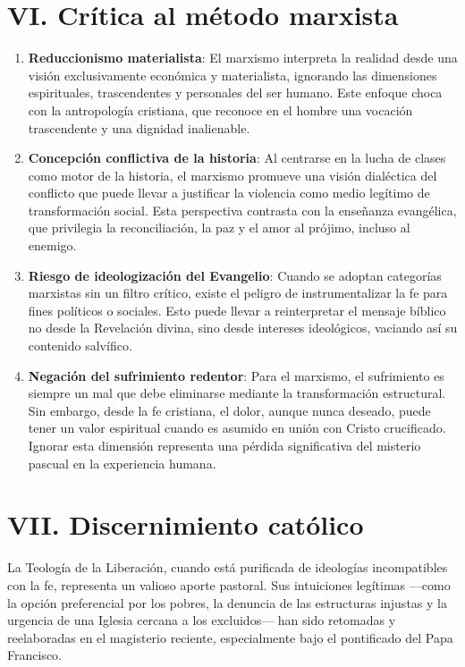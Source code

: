 \documentclass[12pt]{article}
\begin{document}
\section*{VI. Crítica al método marxista}
\begin{enumerate}
    \item \textbf{Reduccionismo materialista}: El marxismo interpreta la realidad desde una visión exclusivamente económica y materialista, ignorando las dimensiones espirituales, trascendentes y personales del ser humano. Este enfoque choca con la antropología cristiana, que reconoce en el hombre una vocación trascendente y una dignidad inalienable.
    
    \item \textbf{Concepción conflictiva de la historia}: Al centrarse en la lucha de clases como motor de la historia, el marxismo promueve una visión dialéctica del conflicto que puede llevar a justificar la violencia como medio legítimo de transformación social. Esta perspectiva contrasta con la enseñanza evangélica, que privilegia la reconciliación, la paz y el amor al prójimo, incluso al enemigo.
    
    \item \textbf{Riesgo de ideologización del Evangelio}: Cuando se adoptan categorías marxistas sin un filtro crítico, existe el peligro de instrumentalizar la fe para fines políticos o sociales. Esto puede llevar a reinterpretar el mensaje bíblico no desde la Revelación divina, sino desde intereses ideológicos, vaciando así su contenido salvífico.
    
    \item \textbf{Negación del sufrimiento redentor}: Para el marxismo, el sufrimiento es siempre un mal que debe eliminarse mediante la transformación estructural. Sin embargo, desde la fe cristiana, el dolor, aunque nunca deseado, puede tener un valor espiritual cuando es asumido en unión con Cristo crucificado. Ignorar esta dimensión representa una pérdida significativa del misterio pascual en la experiencia humana.
\end{enumerate}

\section*{VII. Discernimiento católico}
La Teología de la Liberación, cuando está purificada de ideologías incompatibles con la fe, representa un valioso aporte pastoral. Sus intuiciones legítimas —como la opción preferencial por los pobres, la denuncia de las estructuras injustas y la urgencia de una Iglesia cercana a los excluidos— han sido retomadas y reelaboradas en el magisterio reciente, especialmente bajo el pontificado del Papa Francisco.
\end{document}
